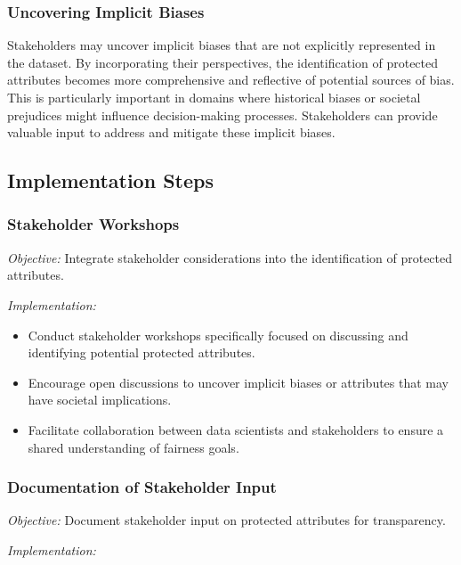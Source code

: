 \documentclass[12pt,a4paper,openright,twoside]{book}
\begin{document}
\subsubsection{Uncovering Implicit Biases}

Stakeholders may uncover implicit biases that are not explicitly represented in the dataset. By incorporating their perspectives, the identification of protected attributes becomes more comprehensive and reflective of potential sources of bias. This is particularly important in domains where historical biases or societal prejudices might influence decision-making processes. Stakeholders can provide valuable input to address and mitigate these implicit biases.

\subsection{Implementation Steps}

\subsubsection{Stakeholder Workshops}

\emph{Objective:} Integrate stakeholder considerations into the identification of protected attributes.

\emph{Implementation:}
\begin{itemize}

    \item Conduct stakeholder workshops specifically focused on discussing and identifying potential protected attributes.

    \item Encourage open discussions to uncover implicit biases or attributes that may have societal implications.

    \item Facilitate collaboration between data scientists and stakeholders to ensure a shared understanding of fairness goals.

\end{itemize}

\subsubsection{Documentation of Stakeholder Input}

\emph{Objective:} Document stakeholder input on protected attributes for transparency.

\emph{Implementation:}
\end{document}
